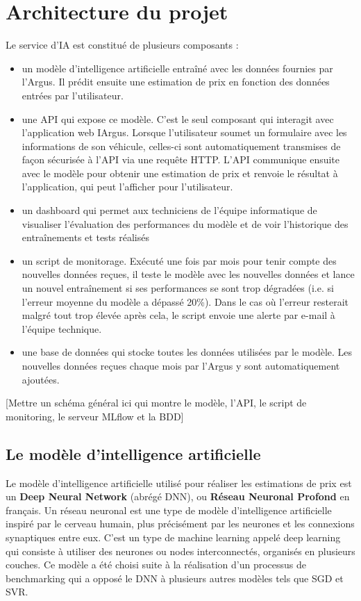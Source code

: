 \documentclass[french]{article}
\begin{document}
    \section{Architecture du projet}
    Le service d'IA est constitué de plusieurs composants :
    \begin{itemize}
        \item un modèle d'intelligence artificielle entraîné avec les données fournies par l'Argus. Il prédit ensuite une estimation de prix en fonction des données entrées par l'utilisateur.
        \item une API qui expose ce modèle. C'est le seul composant qui interagit avec l'application web IArgus. Lorsque l'utilisateur soumet un formulaire avec les informations de son véhicule, celles-ci sont automatiquement transmises de façon sécurisée à l'API via une requête HTTP. L'API communique ensuite avec le modèle pour obtenir une estimation de prix et renvoie le résultat à l'application, qui peut l'afficher pour l'utilisateur. 
        \item un dashboard qui permet aux techniciens de l'équipe informatique de visualiser l'évaluation des performances du modèle et de voir l'historique des entraînements et tests réalisés
        \item un script de monitorage. Exécuté une fois par mois pour tenir compte des nouvelles données reçues, il teste le modèle avec les nouvelles données et lance un nouvel entraînement si ses performances se sont trop dégradées (i.e. si l'erreur moyenne du modèle a dépassé 20\%). Dans le cas où l'erreur resterait malgré tout trop élevée après cela, le script envoie une alerte par e-mail à l'équipe technique.
        \item une base de données qui stocke toutes les données utilisées par le modèle. Les nouvelles données reçues chaque mois par l'Argus y sont automatiquement ajoutées.
    \end{itemize}
    [Mettre un schéma général ici qui montre le modèle, l'API, le script de monitoring, le serveur MLflow et la BDD]

    \subsection{Le modèle d'intelligence artificielle}
    Le modèle d'intelligence artificielle utilisé pour réaliser les estimations de prix est un \textbf{Deep Neural Network} (abrégé DNN), ou \textbf{Réseau Neuronal Profond} en français. Un réseau neuronal est une type de modèle d'intelligence artificielle inspiré par le cerveau humain, plus précisément par les neurones et les connexions synaptiques entre eux. C'est un type de machine learning appelé deep learning qui consiste à utiliser des neurones ou nodes interconnectés, organisés en plusieurs couches. Ce modèle a été choisi suite à la réalisation d'un processus de benchmarking qui a opposé le DNN à plusieurs autres modèles tels que SGD et SVR.
\end{document}
